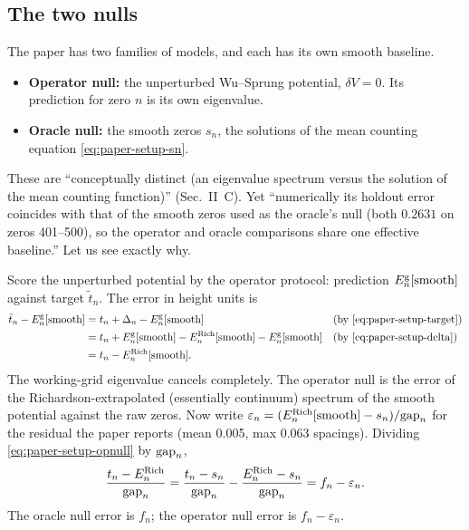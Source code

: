 \subsection{The two nulls}

The paper has two families of models, and each has its own smooth baseline.
\begin{itemize}
\item \textbf{Operator null:} the unperturbed Wu--Sprung potential, $\delta V=0$. Its prediction for zero $n$ is its own eigenvalue.
\item \textbf{Oracle null:} the smooth zeros $s_n$, the solutions of the mean counting equation \eqref{eq:paper-setup-sn}.
\end{itemize}
These are ``conceptually distinct (an eigenvalue spectrum versus the solution of the mean counting function)'' (Sec.~II~C). Yet ``numerically its holdout error coincides with that of the smooth zeros used as the oracle's null (both $0.2631$ on zeros 401--500), so the operator and oracle comparisons share one effective baseline.'' Let us see exactly why.

Score the unperturbed potential by the operator protocol: prediction $E_n^{\rm g}[\text{smooth}]$ against target $\tilde t_n$. The error in height units is
\begin{align}
\tilde t_n-E_n^{\rm g}[\text{smooth}]
&=t_n+\Delta_n-E_n^{\rm g}[\text{smooth}]
&&\text{(by \eqref{eq:paper-setup-target})}\nonumber\\
&=t_n+E_n^{\rm g}[\text{smooth}]-E_n^{\rm Rich}[\text{smooth}]-E_n^{\rm g}[\text{smooth}]
&&\text{(by \eqref{eq:paper-setup-delta})}\nonumber\\
&=t_n-E_n^{\rm Rich}[\text{smooth}]. \label{eq:paper-setup-opnull}
\end{align}
The working-grid eigenvalue cancels completely. The operator null is the error of the Richardson-extrapolated (essentially continuum) spectrum of the smooth potential against the raw zeros. Now write $\varepsilon_n=(E^{\rm Rich}_n[\text{smooth}]-s_n)/\mathrm{gap}_n$ for the residual the paper reports (mean 0.005, max 0.063 spacings). Dividing \eqref{eq:paper-setup-opnull} by $\mathrm{gap}_n$,
\begin{equation}
\frac{t_n-E_n^{\rm Rich}}{\mathrm{gap}_n}=\frac{t_n-s_n}{\mathrm{gap}_n}-\frac{E_n^{\rm Rich}-s_n}{\mathrm{gap}_n}=f_n-\varepsilon_n .
\label{eq:paper-setup-twonulls}
\end{equation}
The oracle null error is $f_n$; the operator null error is $f_n-\varepsilon_n$.

